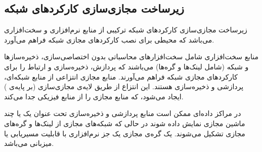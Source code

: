 \subsection{زیرساخت مجازی‌سازی کارکردهای شبکه}
زیرساخت مجازی‌سازی کارکردهای شبکه ترکیبی از منابع نرم‌افزاری و سخت‌افزاری می‌باشد
که محیطی برای نصب
کارکردهای مجازی شبکه فراهم می‌آورد.

منابع سخت‌افزاری شامل سخت‌افزارهای محاسباتی بدون اختصاصی‌سازی،
ذخیره‌سازها و شبکه
(شامل لینک‌ها و گره‌ها)
می‌باشند
که پردازش، ذخیره‌سازی و ارتباط را
برای کارکردهای مجازی شبکه فراهم می‌آورند.
منابع مجازی انتزاعی از منابع شبکه‌ای، پردازشی و ذخیر‌ه‌سازی هستند.
این انتزاع از طریق لایه‌ی مجازی‌سازی (بر پایه‌ی ) ایجاد می‌شود،
که منابع مجازی را از منابع فیزیکی جدا می‌کند.

در مراکز داده‌ای ممکن است منابع پردازشی و ذخیره‌سازی تحت عنوان یک یا چند
ماشین مجازی نمایش داده شوند در حالی که شبکه‌های مجازی از لینک‌ها و گره‌های مجازی تشکیل می‌شوند.
یک گره‌ی مجازی یک جز نرم‌افزاری با قابلیت مسیریابی یا میزبانی می‌باشد.